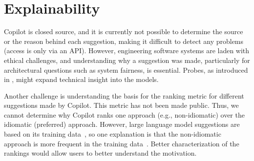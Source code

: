 \section{Explainability}
\label{explain}
Copilot is closed source, and it is currently not possible to determine the source or the reason behind each suggestion, making it difficult to detect any problems (access is only via an API). 
However, engineering software systems are laden with ethical challenges, and understanding why a suggestion was made, particularly for architectural questions such as system fairness, is essential. 
Probes, as introduced in \cite{karmakar21}, might expand technical insight into the models.

Another challenge is understanding the basis for the ranking metric for different suggestions made by Copilot. 
This metric has not been made public. 
Thus, we cannot determine why Copilot ranks one approach (e.g., non-idiomatic) over the idiomatic (preferred) approach. However, large language model suggestions are based on its training data~\cite{training_extraction}, so one explanation is that the non-idiomatic approach is more frequent in the training data~\cite{stochastic_parrots}. 
Better characterization of the rankings would allow users to better understand the motivation. 